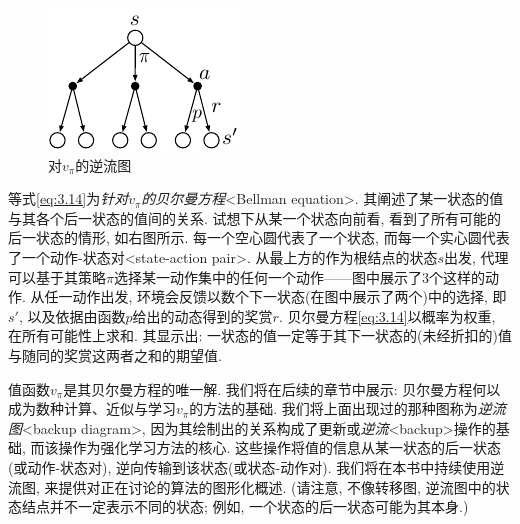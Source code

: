 \begin{figure}
\centering
\includegraphics[width=.3\textwidth]{c3/img/backup_diagram.pdf}\\
对$v_{\pi}$的逆流图
\end{figure}
等式\eqref{eq:3.14}为\emph{针对$v_{\pi}$的贝尔曼方程}<Bellman equation>. 其阐述了某一状态的值与其各个后一状态的值间的关系. 试想下从某一个状态向前看, 看到了所有可能的后一状态的情形, 如右图所示. 每一个空心圆代表了一个状态, 而每一个实心圆代表了一个动作-状态对<state-action pair>. 从最上方的作为根结点的状态$s$出发, 代理可以基于其策略$\pi$选择某一动作集中的任何一个动作——图中展示了3个这样的动作. 从任一动作出发, 环境会反馈以数个下一状态(在图中展示了两个)中的选择, 即$s'$, 以及依据由函数$p$给出的动态得到的奖赏$r$. 贝尔曼方程\eqref{eq:3.14}以概率为权重, 在所有可能性上求和. 其显示出: 一状态的值一定等于其下一状态的(未经折扣的)值与随同的奖赏这两者之和的期望值.

值函数$v_{\pi}$是其贝尔曼方程的唯一解. 我们将在后续的章节中展示: 贝尔曼方程何以成为数种计算、近似与学习$v_{\pi}$的方法的基础. 我们将上面出现过的那种图称为\emph{逆流图}<backup diagram>, 因为其绘制出的关系构成了更新或\emph{逆流}<backup>操作的基础, 而该操作为强化学习方法的核心. 这些操作将值的信息从某一状态的后一状态(或动作-状态对), 逆向传输到该状态(或状态-动作对). 我们将在本书中持续使用逆流图, 来提供对正在讨论的算法的图形化概述. (请注意, 不像转移图, 逆流图中的状态结点并不一定表示不同的状态; 例如, 一个状态的后一状态可能为其本身.)

